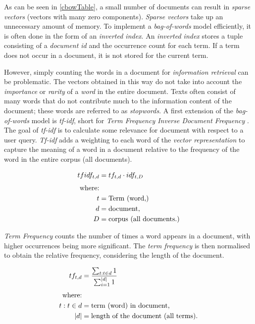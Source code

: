 \documentclass{article}
\begin{document}
As can be seen in \cref{cbowTable}, a small number of documents can result in \textit{sparse vectors} (vectors with many zero components). \textit{Sparse vectors} take up an unnecessary amount of memory. To implement a \textit{bag-of-words} model efficiently, it is often done in the form of an \textit{inverted index}. An \textit{inverted index} stores a tuple consisting of a \textit{document id} and the occurrence count for each term. If a term does not occur in a document, it is not stored for the current term.

However, simply counting the words in a document for \textit{information retrieval} can be problematic. The vectors obtained in this way do not take into account the \textit{importance} or \textit{rarity} of a \textit{word} in the entire document. Texts often consist of many words that do not contribute much to the information content of the document; these words are referred to as \textit{stopwords}. A first extension of the \textit{bag-of-words} model is \textit{tf-idf}, short for \textit{Term Frequency Inverse Document Frequency} \cite[pp.~7ff]{informationRetrievalgoker}. The goal of \textit{tf-idf } is to calculate some relevance for document with respect to a user query. \textit{Tf-idf} adds a weighting to each word of the \textit{vector representation} to capture the meaning of a word in a document relative to the frequency of the word in the entire corpus (all documents). 

\begin{align}
\begin{split}
	tfidf_{t,d} &= tf_{t,d} \cdot idf_{t,D}\\[0.25\baselineskip]
	\text{where:}\\ 
    t &= \text{Term (word,)}\\
	d &= \text{document,}\\ 
	D &= \text{corpus (all documents.)}
\end{split}
\end{align}


\textit{Term Frequency} counts the number of times a word appears in a document, with higher occurrences being more significant. The \textit{term frequency} is then normalised to obtain the relative frequency, considering the length of the document.

\begin{align}
\begin{split}
	tf_{t,d} &= \frac{\sum_{t: t \in d}1}{\sum_{i=1}^{|d|}1}\\[0.25\baselineskip]
	\text{where:}\\
	t: t \in d &= \text{term (word) in document,}\\ 
    |d| &= \text{length of the document (all terms).}\\ 
\end{split}
\end{align}
\end{document}
